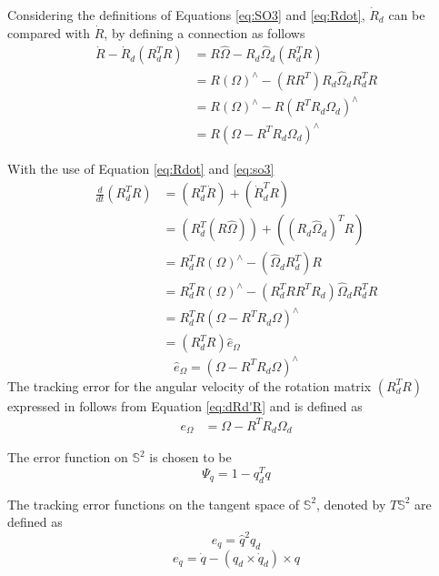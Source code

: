 Considering the definitions of Equations \ref{eq:SO3} and \ref{eq:Rdot}, $ \dot{R}_d $ can be compared with $ \dot{R} $, by defining a connection as follows
\begin{equation}\label{key}
\begin{aligned}
\dot{R}-\dot{R}_d(R_d^TR) &=R\hat{\Omega}-R_d\hat{\Omega}_d(R_d^TR) \\
&=R(\Omega)^\wedge-(RR^T)R_d\hat{\Omega}_dR_d^TR\\
&=R(\Omega)^\wedge-R(R^TR_d{\Omega}_d)^\wedge \\
&=R(\Omega-R^TR_d{\Omega}_d)^\wedge 
\end{aligned}
\end{equation}


With the use of Equation \ref{eq:Rdot} and \ref{eq:so3} 
\begin{equation}\label{eq:dRd'R}
\begin{aligned}
\frac{d}{dt}(R^T_dR)&=(R^T_d\dot{R})+(\dot{R}^T_dR)\\
&=(R^T_d(R\hat{\Omega}))+((R_d\hat{\Omega}_d)^TR)\\
&=R^T_dR(\Omega)^\wedge-(\hat{\Omega}_dR_d^T)R\\
&=R^T_dR(\Omega)^\wedge-(R^T_dRR^TR_d)\hat{\Omega}_dR_d^TR\\
&=R^T_dR(\Omega-R^TR_d\Omega)^\wedge\\
&=(R^T_dR)\hat{e}_\Omega
\end{aligned}
\end{equation}
\begin{equation}\label{eq:ehatOmega}
\hat{e}_\Omega = (\Omega-R^TR_d\Omega)^\wedge
\end{equation}
The tracking error for the angular velocity of the rotation matrix $ (R_d^TR)$ expressed in \BF follows from Equation \ref{eq:dRd'R} and is defined as
\begin{align}\label{key}
e_\Omega&=\Omega- R^TR_d\Omega_d
\end{align}


The error function on $ \mathbb{S}^2 $ is chosen to be 
\begin{equation}\label{eq:psiq}
\Psi_q=1-q_d^Tq
\end{equation}


The tracking error functions on the tangent space of $ \mathbb{S}^2 $, denoted by $ T\mathbb{S}^2$ are defined as
\begin{equation}\label{key}
e_q=\hat{q}^2
q_d\end{equation}
\begin{equation}\label{key}
e_{\dot{q}} =\dot{q}-(q_d\times\dot{q}_d)\times q
\end{equation}

